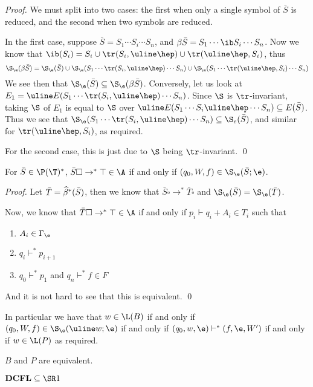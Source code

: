\documentclass{llncs}
\begin{document}
\begin{proof}

    We must split into two cases: the first when only a single symbol of $\bar S$ is reduced, and the second when two symbols are reduced.

    In the first case, suppose $\bar S=S_1\cdots S_i\cdots S_n$, and $\beta\bar S=S_1\cdots\ib S_i\cdots S_n$.
    Now we know that $\ib(S_i)=S_i\cup\tr(S_i,\uline\hep)\cup\tr(\uline\hep,S_i)$, thus
    $$ \S_\e(\beta\bar S) = \S_\e(\bar S)\cup\S_\e(S_1\cdots\tr(S_i,\uline\hep)\cdots S_n)\cup\S_\e(S_1\cdots\tr(\uline\hep,S_i)\cdots S_n) $$
    We see then that $\S_\e(\bar S)\subseteq\S_\e(\beta\bar S)$.
    Conversely, let us look at $E_1=\uline E(S_1\cdots\tr(S_i,\uline\hep)\cdots S_n)$.
    Since $\S$ is $\tr$-invariant, taking $\S$ of $E_1$ is equal to $\S$ over $\uline E(S_1\cdots S_i\uline\hep\cdots S_n)\subseteq E(\bar S)$.
    Thus we see that $\S_\e(S_1\cdots\tr(S_i,\uline\hep)\cdots S_n)\subseteq\S_e(\bar S)$, and similar for $\tr(\uline\hep,S_i)$, as required.

    For the second case, this is just due to $\S$ being $\tr$-invariant.
    \qed

\end{proof}

\begin{lemma}

    For $\bar S\in\P(\T)^*$, $\bar S\square\to^*\top\in\A$ if and only if $(q_0,W,f)\in \S_\e(\bar S;\e)$.

\end{lemma}

\begin{proof}

    Let $\bar T=\widehat\beta^*(\bar S)$, then we know that $\bar S\square\to^*\bar T\square$ and $\S_\e(\bar S)=\S_\e(\bar T)$.

    Now, we know that $\bar T\square\to^*\top\in\A$ if and only if $p_i\vdash q_i+A_i\in T_i$ such that
    \begin{enumerate}
        \item $A_i\in\Gamma_\e$
        \item $q_i\vdash^* p_{i+1}$
        \item $q_0\vdash^* p_1$ and $q_n\vdash^* f\in F$
    \end{enumerate}
    And it is not hard to see that this is equivalent.
    \qed

\end{proof}

In particular we have that $w\in\L(B)$ if and only if $(q_0,W,f)\in\S_\e(\uline w;\e)$ if and only if $(q_0,w,\e)\vdash^*(f,\e,W')$ if and only if $w\in\L(P)$ as required.

\begin{theorem}

    $B$ and $P$ are equivalent.

\end{theorem}

\begin{theorem}

    $\DCFL\subseteq\SR1$

\end{theorem}
\end{document}
